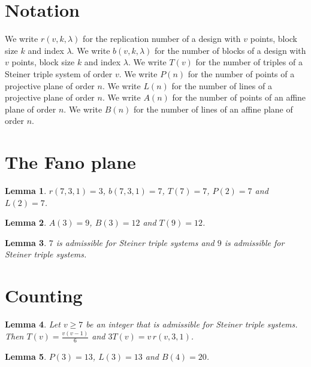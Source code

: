 \documentclass{article}
\newtheorem{lemma}{Lemma}
\begin{document}
\section{Notation}

We write $r(v,k,\lambda)$ for the replication number of a design with $v$ points, block size $k$ and index $\lambda$.
We write $b(v,k,\lambda)$ for the number of blocks of a design with $v$ points, block size $k$ and index $\lambda$.
We write $T(v)$ for the number of triples of a Steiner triple system of order $v$.
We write $P(n)$ for the number of points of a projective plane of order $n$.
We write $L(n)$ for the number of lines of a projective plane of order $n$.
We write $A(n)$ for the number of points of an affine plane of order $n$.
We write $B(n)$ for the number of lines of an affine plane of order $n$.

\section{The Fano plane}

\begin{lemma}\label{fano}
$r(7,3,1)=3$, $b(7,3,1)=7$, $T(7)=7$, $P(2)=7$ and $L(2)=7$.
\end{lemma}

\begin{lemma}\label{affine}
$A(3)=9$, $B(3)=12$ and $T(9)=12$.
\end{lemma}

\begin{lemma}\label{admissible}
$7$ is admissible for Steiner triple systems and $9$ is admissible for Steiner triple systems.
\end{lemma}

\section{Counting}

\begin{lemma}\label{count}
Let $v\ge7$ be an integer that is admissible for Steiner triple systems. Then $T(v)=\frac{v(v-1)}{6}$ and $3T(v)=v\,r(v,3,1)$.
\end{lemma}

\begin{lemma}\label{planes}
$P(3)=13$, $L(3)=13$ and $B(4)=20$.
\end{lemma}
\end{document}
